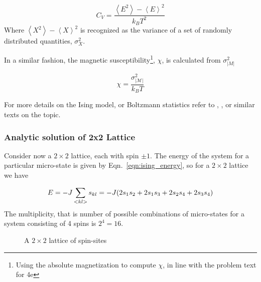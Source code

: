 \documentclass[10pt,showpacs,preprintnumbers,amsmath,amssymb,nofootinbib,aps,prl,twocolumn,groupedaddress,superscriptaddress,showkeys]{revtex4-1}
\begin{document}
      \begin{equation}
        C_V = \frac{\left<E^2\right> - \left<E\right>^2}{k_B T^2}
        \label{eqn:speciffic heat}
      \end{equation}
      Where $\left<X^2\right> - \left<X\right>^2$ is recognized as the variance of a set of randomly distributed quantities, $\sigma_X^2$.

      In a similar fashion, the magnetic susceptibility\footnote{Using the absolute magnetization to compute $\chi$, in line with the problem text for 4e}, $\chi$, is calculated from $\sigma_{\mathcal |M|} ^2$ \cite{statmek_lecnotes}

      \begin{equation}
        \chi = \frac{\sigma^2_\mathcal{|M|}}{k_B T}
        \label{eqn:suceptibility}
      \end{equation}

      For more details on the Ising model, or Boltzmann statistics refer to \textcite[Ch~6, 8.2]{schroeder}, \textcite{statmek_lecnotes}, or similar texts on the topic.

  \subsubsection{Analytic solution of 2x2 Lattice}
    Consider now a $2\times2$ lattice, each with spin $\pm 1$.
    The energy of the system for a particular micro-state is given by Eqn.~\ref{eqn:ising_energy}, so for a $2\times2$ lattice we have

    \begin{equation}
      E = -J\sum_{<kl>}s_{kl} = -J\qty( 2s_1s_2 + 2s_1s_3 + 2s_2s_4 + 2s_3s_4)
    \end{equation}
    The multiplicity, that is number of possible combinations of micro-states for a system consisting of 4 spins is $2^4=16$.

     \begin{figure}[H]
      \centering
      \caption{A $2\times2$ lattice of spin-sites}
    \end{figure}
\end{document}
